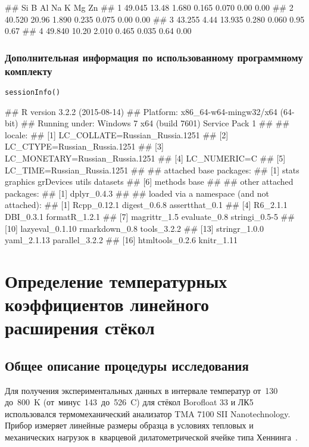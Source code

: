 \begin{Verb}
##       Si     B     Al    Na     K   Mg   Zn
## 1 49.045 13.48  1.680 0.165 0.070 0.00 0.00
## 2 40.520 20.96  1.890 0.235 0.075 0.00 0.00
## 3 43.255  4.44 13.935 0.280 0.060 0.95 0.67
## 4 49.840 10.20  2.010 0.465 0.035 0.64 0.00
\end{Verb}

\subsubsection{Дополнительная информация по использованному программному комплекту}
\begin{lstlisting}[language=Renhanced]
sessionInfo()
\end{lstlisting}

\begin{Verb}
## R version 3.2.2 (2015-08-14)
## Platform: x86_64-w64-mingw32/x64 (64-bit)
## Running under: Windows 7 x64 (build 7601) Service Pack 1
##
## locale:
## [1] LC_COLLATE=Russian_Russia.1251
## [2] LC_CTYPE=Russian_Russia.1251
## [3] LC_MONETARY=Russian_Russia.1251
## [4] LC_NUMERIC=C
## [5] LC_TIME=Russian_Russia.1251
##
## attached base packages:
## [1] stats     graphics  grDevices utils     datasets
## [6] methods   base
##
## other attached packages:
## [1] dplyr_0.4.3
##
## loaded via a namespace (and not attached):
##  [1] Rcpp_0.12.1     digest_0.6.8    assertthat_0.1
##  [4] R6_2.1.1        DBI_0.3.1       formatR_1.2.1
##  [7] magrittr_1.5    evaluate_0.8    stringi_0.5-5
## [10] lazyeval_0.1.10 rmarkdown_0.8   tools_3.2.2
## [13] stringr_1.0.0   yaml_2.1.13     parallel_3.2.2
## [16] htmltools_0.2.6 knitr_1.11
\end{Verb}

\section{Определение температурных коэффициентов линейного расширения стёкол}\label{chap_cte_measure}
\subsection{Общее описание процедуры исследования}
\begingroup
Для получения экспериментальных данных в интервале температур от~130 до~800~K (от~минус~143~до~526~{\textdegree}C) для стёкол Borofloat 33 и ЛК5 использовался термомеханический анализатор TMA 7100 SII Nanotechnology.
Прибор измеряет линейные размеры образца в условиях тепловых и
механических нагрузок в~кварцевой дилатометрической ячейке типа
Хеннинга~\cites[58]{novikova1974}.\russianpar
\endgroup

